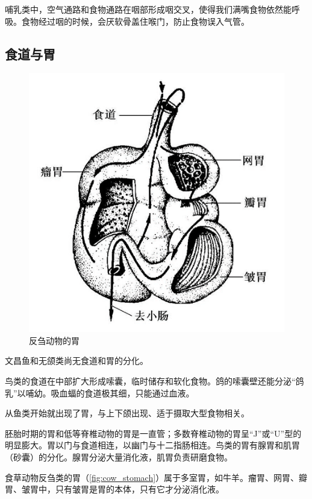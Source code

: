 哺乳类中，空气通路和食物通路在咽部形成咽交叉，使得我们满嘴食物依然能呼吸。食物经过咽的时候，会厌软骨盖住喉门，防止食物误入气管。

\subsection{食道与胃}

\begin{figure}
	\centering
	\includegraphics[width=\linewidth]{Pics/反刍胃}
	\caption{反刍动物的胃}
	\label{fig:cow_stomach}
\end{figure}

文昌鱼和无颌类尚无食道和胃的分化。

鸟类的食道在中部扩大形成嗦囊，临时储存和软化食物。鸽的嗦囊壁还能分泌“鸽乳”以哺幼。吸血蝠的食道极其细，只能通过血液。

从鱼类开始就出现了胃，与上下颌出现、适于摄取大型食物相关。

胚胎时期的胃和低等脊椎动物的胃是一直管；多数脊椎动物的胃呈“J”或“U”型的明显膨大。胃以门与食道相连，以幽门与十二指肠相连。鸟类的胃有腺胃和肌胃（砂囊）的分化。腺胃分泌大量消化液，肌胃负责研磨食物。

食草动物反刍类的胃（\autoref{fig:cow_stomach}）属于多室胃，如牛羊。瘤胃、网胃、瓣胃、皱胃中，只有皱胃是胃的本体，只有它才分泌消化液。

